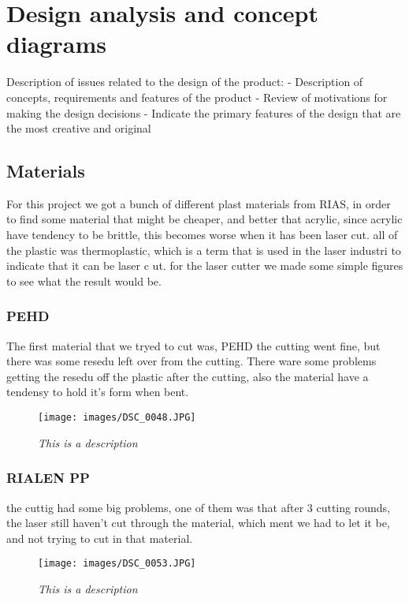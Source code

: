 \section{Design analysis and concept diagrams}
Description of issues related to the design of the product:
- Description of concepts, requirements and features of the product
- Review of motivations for making the design decisions
- Indicate the primary features of the design that are the most creative and original

\subsection{Materials}
For this project we got a bunch of different plast materials from RIAS, in order to find some material that might be cheaper, and better that acrylic, since acrylic have tendency to be brittle, this becomes worse when it has been laser cut.
all of the plastic was thermoplastic, which is a term that is used in the laser industri to indicate that it can be laser c ut.
for the laser cutter we made some simple figures to see what the result would be.
\subsubsection{PEHD}
The first material that we tryed to cut was, PEHD the cutting went fine, but there was some resedu left over from the cutting.
There ware some problems getting the resedu off the plastic after the cutting, also the material have a tendensy to hold it's form when bent.
\begin{figure}[h]
	\begin{center}
		\texttt{[image: images/DSC\_0048.JPG]}
		\caption{\small {\it {This is a description}}} \label{fig:explode}
	\end{center}
\end{figure}
\subsubsection{RIALEN PP}
the cuttig had some big problems, one of them was that after 3 cutting rounds, the laser still haven't cut through the material, which ment we had to let it be, and not trying to cut in that material. 
\begin{figure}[h]
	\begin{center}
		\texttt{[image: images/DSC\_0053.JPG]}
		\caption{\small {\it {This is a description}}} \label{fig:explode}
	\end{center}
\end{figure}
